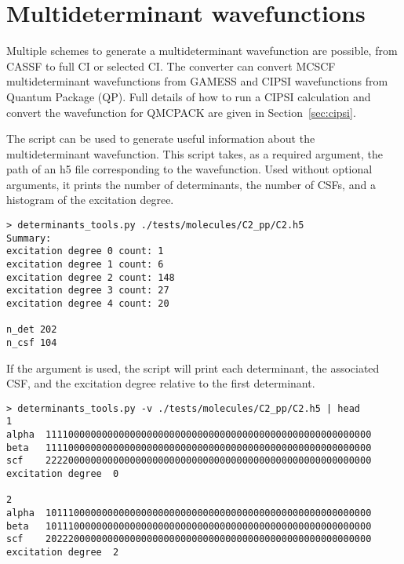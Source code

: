 \section{Multideterminant wavefunctions}
\label{sec:multideterminants}
Multiple schemes to generate a multideterminant wavefunction are
possible, from CASSF to full CI or selected CI. The \qmcpack converter can
convert MCSCF multideterminant wavefunctions from
GAMESS\cite{schmidt93} and CIPSI\cite{Caffarel2013} wavefunctions from
Quantum Package\cite{QP} (QP). Full details of how to run a CIPSI
calculation and convert the wavefunction for QMCPACK are given in 
Section~\ref{sec:cipsi}.

The script  can be used to generate
useful information about the multideterminant wavefunction. This script takes, as a required argument, the path of an h5 file corresponding to the wavefunction. Used without optional arguments, it prints the number of determinants, the number of CSFs, and a histogram of the excitation degree.

\begin{lstlisting}[style=SHELL]
> determinants_tools.py ./tests/molecules/C2_pp/C2.h5
Summary:
excitation degree 0 count: 1
excitation degree 1 count: 6
excitation degree 2 count: 148
excitation degree 3 count: 27
excitation degree 4 count: 20

n_det 202
n_csf 104
\end{lstlisting}

If the  argument is used, the script will print each determinant,
the associated CSF, and the excitation degree relative to the first determinant.
\begin{lstlisting}[style=SHELL]
> determinants_tools.py -v ./tests/molecules/C2_pp/C2.h5 | head
1
alpha  1111000000000000000000000000000000000000000000000000000000
beta   1111000000000000000000000000000000000000000000000000000000
scf    2222000000000000000000000000000000000000000000000000000000
excitation degree  0

2
alpha  1011100000000000000000000000000000000000000000000000000000
beta   1011100000000000000000000000000000000000000000000000000000
scf    2022200000000000000000000000000000000000000000000000000000
excitation degree  2
\end{lstlisting}
